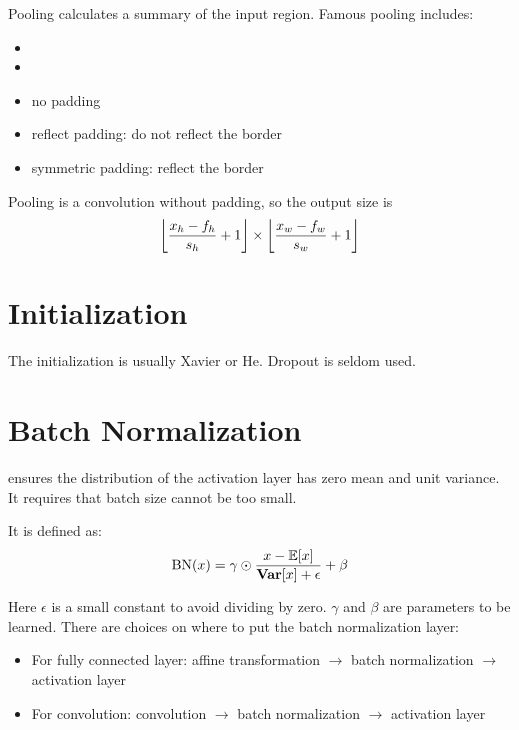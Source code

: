 Pooling calculates a summary of the input region. Famous pooling includes:
\begin{itemize}
    \item {}
    \item {}
    \item no padding
    \item reflect padding: do not reflect the border
    \item symmetric padding: reflect the border
\end{itemize}


            
            
            
Pooling is a convolution without padding, so the output size is
\begin{equation}
    \mleft\lfloor \frac{x_h - f_h}{s_h} + 1 \mright\rfloor \times \mleft\lfloor \frac{x_w - f_w}{s_w} + 1 \mright\rfloor
\end{equation}



\section{Initialization}

The initialization is usually Xavier or He. Dropout is seldom used.



\section{Batch Normalization}

 ensures the distribution of the activation layer has zero mean and unit variance. It requires that batch size cannot be too small. 

It is defined as:
\begin{equation}
    \text{BN}(x) = \gamma \odot \frac{x - \expectation{x}}{\variance{x} + \epsilon} + \beta
\end{equation}

Here $\epsilon$ is a small constant to avoid dividing by zero. $\gamma$ and $\beta$ are parameters to be learned. There are choices on where to put the batch normalization layer:
\begin{itemize}
    \item For fully connected layer: affine transformation $\rightarrow$ batch normalization $\rightarrow$ activation layer
    \item For convolution: convolution $\rightarrow$ batch normalization $\rightarrow$ activation layer
\end{itemize}

